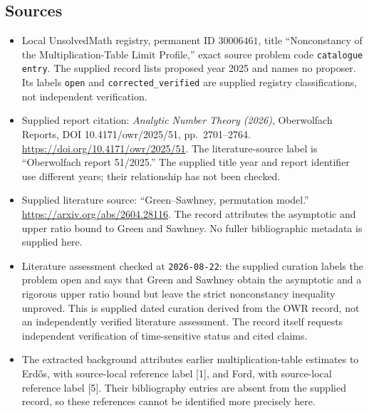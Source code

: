 \documentclass[11pt]{article}
\begin{document}
\subsection{Sources}
\begin{itemize}
\item Local UnsolvedMath registry, permanent ID \(30006461\), title ``Nonconstancy of the Multiplication-Table Limit Profile,'' exact source problem code \texttt{catalogue entry}. The supplied record lists proposed year 2025 and names no proposer. Its labels \texttt{open} and \texttt{corrected\_verified} are supplied registry classifications, not independent verification.
\item Supplied report citation: \emph{Analytic Number Theory (2026)}, Oberwolfach Reports, DOI 10.4171/owr/2025/51, pp.\ 2701--2764. \url{https://doi.org/10.4171/owr/2025/51}. The literature-source label is ``Oberwolfach report 51/2025.'' The supplied title year and report identifier use different years; their relationship has not been checked.
\item Supplied literature source: ``Green--Sawhney, permutation model.'' \url{https://arxiv.org/abs/2604.28116}. The record attributes the asymptotic and upper ratio bound to Green and Sawhney. No fuller bibliographic metadata is supplied here.
\item Literature assessment checked at \texttt{2026-08-22}: the supplied curation labels the problem open and says that Green and Sawhney obtain the asymptotic and a rigorous upper ratio bound but leave the strict nonconstancy inequality unproved. This is supplied dated curation derived from the OWR record, not an independently verified literature assessment. The record itself requests independent verification of time-sensitive status and cited claims.
\item The extracted background attributes earlier multiplication-table estimates to Erd\H{o}s, with source-local reference label [1], and Ford, with source-local reference label [5]. Their bibliography entries are absent from the supplied record, so these references cannot be identified more precisely here.
\end{itemize}
\end{document}

